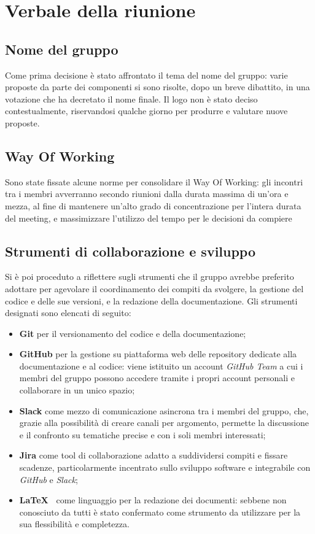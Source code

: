 
\section{Verbale della riunione}
\subsection{Nome del gruppo}
Come prima decisione è stato affrontato il tema del nome del gruppo: varie proposte da parte dei componenti si sono risolte, dopo un breve dibattito, in una votazione che ha decretato il nome finale. Il logo non è stato deciso contestualmente, riservandosi qualche giorno per produrre e valutare nuove proposte.

\subsection{Way Of Working}
Sono state fissate alcune norme per consolidare il Way Of Working: gli incontri tra i membri avverranno secondo riunioni dalla durata massima di un'ora e mezza, al fine di mantenere un'alto grado di concentrazione per l'intera durata del meeting, e massimizzare l'utilizzo del tempo per le decisioni da compiere

\subsection{Strumenti di collaborazione e sviluppo}
Si è poi proceduto a riflettere sugli strumenti che il gruppo avrebbe preferito adottare per agevolare il coordinamento dei compiti da svolgere, la gestione del codice e delle sue versioni, e la redazione della documentazione.
Gli strumenti designati sono elencati di seguito:

\begin{itemize}
	\item \textbf{Git} per il versionamento del codice e della documentazione;
	\item \textbf{GitHub} per la gestione su piattaforma web delle repository dedicate alla documentazione e al codice: viene istituito un account \textit{GitHub Team} a cui i membri del gruppo possono accedere tramite i propri account personali e collaborare in un unico spazio;
	\item \textbf{Slack} come mezzo di comunicazione asincrona tra i membri del gruppo, che, grazie alla possibilità di creare canali per argomento, permette la discussione e il confronto su tematiche precise e con i soli membri interessati;
	\item \textbf{Jira} come tool di collaborazione adatto a suddividersi compiti e fissare scadenze, particolarmente incentrato sullo sviluppo software  e integrabile con \textit{GitHub} e \textit{Slack}; 
	\item \textbf{\LaTeX\ } come linguaggio per la redazione dei documenti: sebbene non conosciuto da tutti è stato confermato come strumento da utilizzare per la sua flessibilità e completezza.
\end{itemize}

